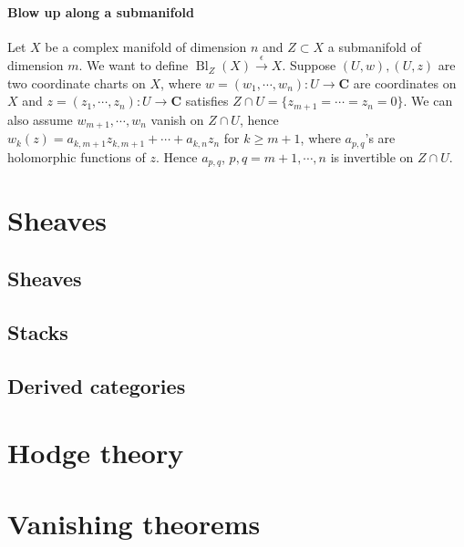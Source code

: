 \documentclass[
11pt, %
letterpaper， %
oneside, %
headinclude,footinclude, %
BCOR5mm, %
]{scrartcl}
\newcommand{\C}{{\mathbf{C}}}
\newcommand{\bl}{\operatorname{Bl}}
\begin{document}
\paragraph{Blow up along a submanifold}
	Let $X$ be a complex manifold of dimension $n$ and $Z\subset X$ a submanifold of dimension $m$. We want to define $\bl_Z(X)\stackrel{\epsilon}{\to}X$. Suppose $(U,w), (U,z)$ are two coordinate charts on $X$, where $w=(w_1,\cdots, w_n): U \to \C$ are coordinates on $X$ and $z=(z_1,\cdots, z_n): U \to \C$ satisfies $Z\cap U=\{z_{m+1}=\cdots=z_n=0 \}$. We can also assume $w_{m+1},\cdots, w_n$ vanish on $Z\cap U$, hence $w_k(z)=a_{k,m+1}z_{k,m+1}+\cdots+a_{k,n}z_n$ for $k\ge m+1$, where $a_{p,q}$'s are holomorphic functions of $z$. Hence $a_{p,q}$, $p,q =m+1, \cdots, n$ is invertible on $Z\cap U$.

\section{Sheaves}
\subsection{Sheaves}
\subsection{Stacks}
\subsection{Derived categories}

\section{Hodge theory}
\section{Vanishing theorems}





\renewcommand{\refname}{\spacedlowsmallcaps{References}} %




\end{document}
